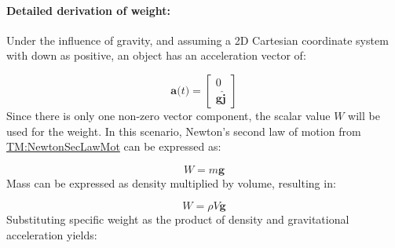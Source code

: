 \documentclass[12pt]{article}
\begin{document}
\paragraph{Detailed derivation of weight:}
\label{GD:weightDeriv}
Under the influence of gravity, and assuming a 2D Cartesian coordinate system with down as positive, an object has an acceleration vector of:

\begin{displaymath}
\symbf{a}\text{(}t\text{)}=\begin{bmatrix}
                           0\\
                           \symbf{g} \symbf{\hat{j}}
                           \end{bmatrix}
\end{displaymath}
Since there is only one non-zero vector component, the scalar value $W$ will be used for the weight. In this scenario, Newton's second law of motion from \hyperref[TM:NewtonSecLawMot]{TM:NewtonSecLawMot} can be expressed as:

\begin{displaymath}
W=m \symbf{g}
\end{displaymath}
Mass can be expressed as density multiplied by volume, resulting in:

\begin{displaymath}
W=ρ V \symbf{g}
\end{displaymath}
Substituting specific weight as the product of density and gravitational acceleration yields:
\end{document}
